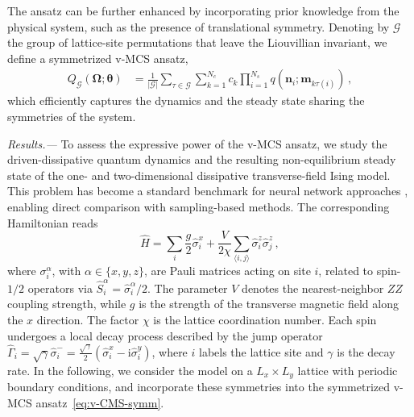 \documentclass[aps,prl,twocolumn,superscriptaddress,english,floatfix]{revtex4-2}
\newcommand{\vect}[1]{\boldsymbol{#1}}
\renewcommand{\vec}[1]{\vect{#1}}
\newcommand{\Omegavec}{\vec{\Omega}}
\newcommand{\thetavec}{{\vec{\theta}}}
\newcommand{\sigmahat}{\hat{\sigma}}
\newcommand{\Gcal}{\mathcal{G}}
\newcommand{\mvec}{\vec{m}}
\newcommand{\nvec}{{\vec{n}}}
\newcommand{\Shat}{\hat{S}}
\newcommand{\bea}{\begin{equation}\begin{aligned}}
\newcommand{\eea}{\end{aligned}\end{equation}}
\begin{document}
The ansatz can be further enhanced by incorporating prior knowledge from the physical system, such as the presence of translational symmetry. Denoting by $\Gcal$ the group of lattice-site permutations that leave the Liouvillian invariant, we define a symmetrized v-MCS ansatz,
\bea\label{eq:v-CMS-symm}
    Q_\Gcal(\Omegavec;\thetavec) &= \frac{1}{|\Gcal|}\sum_{\tau\in\Gcal}\sum_{k=1}^{N_c}c_k\prod_{i=1}^{N_s}q(\nvec_i;\mvec_{k\tau(i)})\,,
\eea
which efficiently captures the dynamics and the steady state sharing the symmetries of the system.

{\it Results.---}
To assess the expressive power of the v-MCS  ansatz, we study the driven-dissipative quantum dynamics and the resulting non-equilibrium steady state of the one- and two-dimensional dissipative transverse-field Ising model. This problem has become a standard benchmark for neural network approaches \cite{Vicentini2019, Luo2022, Mellak2024}, enabling direct comparison with sampling-based methods. The corresponding Hamiltonian reads 
\begin{equation}
    \hat H = \sum_i \frac{g}{2} \hat \sigma_i^x + \frac{V}{2 \chi} \sum_{\langle i,j \rangle} \hat \sigma_i^z \hat \sigma_{j}^z\,,
\end{equation}
where $\sigma_i^\alpha$, with $\alpha \in \{x,y,z\}$, are Pauli matrices acting on site $i$, related to spin-$1/2$ operators via $\Shat^\alpha_i=\sigmahat^\alpha_i/2$. 
The parameter $V$ denotes the nearest-neighbor $ZZ$ coupling strength, while $g$ is the strength of the transverse magnetic field along the $x$ direction. The factor $\chi$ is the lattice coordination number.
Each spin undergoes a local decay process described by the jump operator $\hat \Gamma_i = \sqrt{\gamma}\hat \sigma_i^- = \frac{\sqrt{\gamma}}{2}(\hat \sigma_i^x - \mathrm i \hat \sigma_i^y)$, where $i$ labels the lattice site and $\gamma$ is the decay rate. 
In the following, we consider the model on a $L_x\times L_y$ lattice with periodic boundary conditions, and incorporate these symmetries into the symmetrized v-MCS ansatz~\eqref{eq:v-CMS-symm}.
\end{document}
